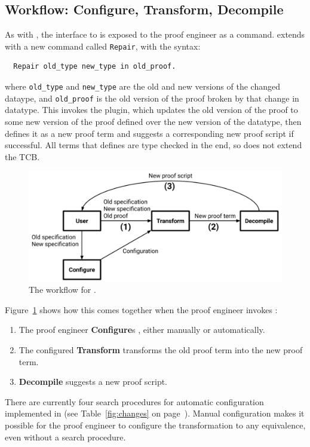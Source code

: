 \subsection{Workflow: Configure, Transform, Decompile}
\label{sec:pi-workflow}

As with \sysname, the interface to \toolnamec is exposed to the proof engineer as a command.
\toolnamec extends \sysnamelong with a new command called \lstinline{Repair},
with the syntax:

\begin{lstlisting}
  Repair old_type new_type in old_proof.
\end{lstlisting}
where \lstinline{old_type} and \lstinline{new_type} are the old and new 
versions of the changed dataype, and \lstinline{old_proof} is the old version
of the proof broken by that change in datatype.
This invokes the \toolnamec plugin, which updates the old version of the proof to some new version of the proof
defined over the new version of the datatype, then defines it as a new proof term and suggests a corresponding new proof script if successful.
All terms that \toolnamec defines are type checked in the end, so \toolnamec does not extend the TCB.

\begin{figure}
\includegraphics[width=\columnwidth]{often/workflowa.pdf}
\vspace{-0.7cm}
\caption{The workflow for \toolnamec.}
\vspace{-0.1cm}
\label{fig:system}
\end{figure}

Figure~\ref{fig:system} shows how this comes together when the proof engineer invokes \toolnamec:

\begin{enumerate}
\item The proof engineer \textbf{Configure}s \toolnamec, either manually or automatically.
\item The configured \textbf{Transform} transforms the old proof term into the new proof term.
\item \textbf{Decompile} suggests a new proof script. %
\end{enumerate}
There are currently four search procedures for automatic configuration implemented in \toolnamec (see Table~\ref{fig:changes} on page~\pageref{fig:changes}).
Manual configuration makes it possible
for the proof engineer to configure the transformation to any equivalence,
even without a search procedure.


